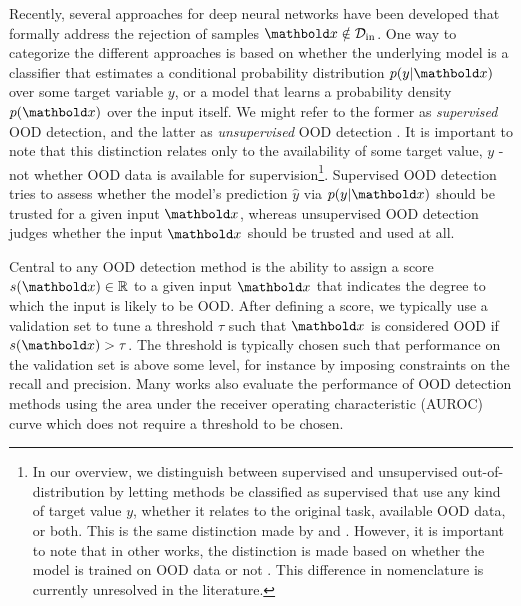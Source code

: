 Recently, several approaches for deep neural networks have been developed that formally address the rejection of samples $\xb\notin\mathcal{D}_{\text{in}}$. 
One way to categorize the different approaches is based on whether the underlying model is a classifier that estimates a conditional probability distribution $p(y|\xb)$ over some target variable $y$, or a model that learns a probability density $p(\xb)$ over the input itself. We might refer to the former as \emph{supervised} OOD detection, and the latter as \emph{unsupervised} OOD detection \cite{graham_denoising_2023,liu_unsupervised_2023a}. It is important to note that this distinction relates only to the availability of some target value, $y$ - not whether OOD data is available for supervision\footnote{
    In our overview, we distinguish between supervised and unsupervised out-of-distribution by letting methods be classified as supervised that use any kind of target value $y$, whether it relates to the original task, available OOD data, or both. This is the same distinction made by \textcite{graham_denoising_2023} and \textcite{liu_unsupervised_2023a}. 
    However, it is important to note that in other works, the distinction is made based on whether the model is trained on OOD data or not \cite{hendrycks_baseline_2017,liu_energy-based_2020}. This difference in nomenclature is currently unresolved in the literature. 
}. 
Supervised OOD detection tries to assess whether the model's prediction $\hat{y}$ via $p(y|\xb)$ should be trusted for a given input $\xb$, whereas unsupervised OOD detection judges whether the input $\xb$ should be trusted and used at all. 

Central to any OOD detection method is the ability to assign a score $s(\xb) \in \mathbb{R}$ to a given input $\xb$ that indicates the degree to which the input is likely to be OOD. After defining a score, we typically use a validation set to tune a threshold $\tau$ such that $\xb$ is considered OOD if $s(\xb) > \tau$. The threshold is typically chosen such that performance on the validation set is above some level, for instance by imposing constraints on the recall and precision. Many works also evaluate the performance of OOD detection methods using the area under the receiver operating characteristic (AUROC) curve which does not require a threshold to be chosen.

